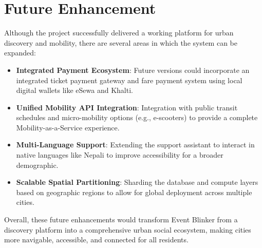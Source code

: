 \section{Future Enhancement}
Although the project successfully delivered a working platform for urban discovery and mobility, there are several areas in which the system can be expanded:

\begin{itemize}
    \item \textbf{Integrated Payment Ecosystem}: Future versions could incorporate an integrated ticket payment gateway and fare payment system using local digital wallets like eSewa and Khalti.
    \item \textbf{Unified Mobility API Integration}: Integration with public transit schedules and micro-mobility options (e.g., e-scooters) to provide a complete Mobility-as-a-Service experience.
    \item \textbf{Multi-Language Support}: Extending the support assistant to interact in native languages like Nepali to improve accessibility for a broader demographic.
    \item \textbf{Scalable Spatial Partitioning}: Sharding the database and compute layers based on geographic regions to allow for global deployment across multiple cities.
\end{itemize}

Overall, these future enhancements would transform Event Blinker from a discovery platform into a comprehensive urban social ecosystem, making cities more navigable, accessible, and connected for all residents.
